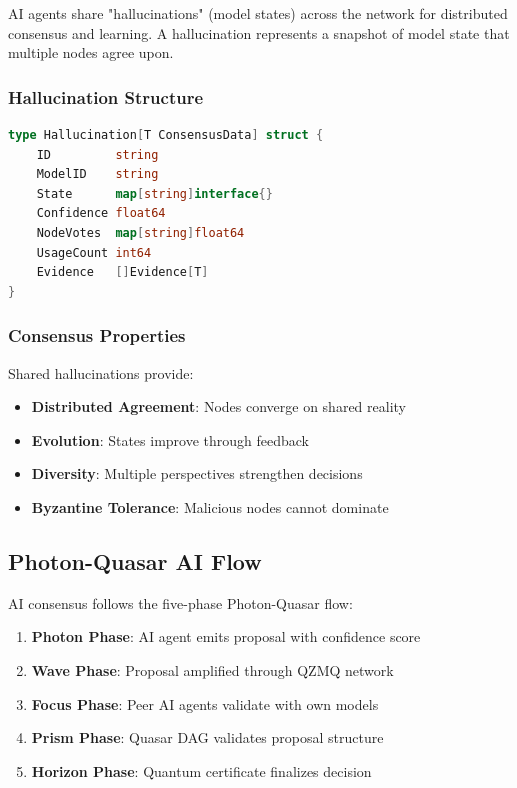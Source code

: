 AI agents share "hallucinations" (model states) across the network for distributed consensus and learning. A hallucination represents a snapshot of model state that multiple nodes agree upon.

\subsubsection{Hallucination Structure}

\begin{lstlisting}[language=Go]
type Hallucination[T ConsensusData] struct {
    ID         string
    ModelID    string
    State      map[string]interface{}
    Confidence float64
    NodeVotes  map[string]float64
    UsageCount int64
    Evidence   []Evidence[T]
}
\end{lstlisting}

\subsubsection{Consensus Properties}

Shared hallucinations provide:

\begin{itemize}
\item \textbf{Distributed Agreement}: Nodes converge on shared reality
\item \textbf{Evolution}: States improve through feedback
\item \textbf{Diversity}: Multiple perspectives strengthen decisions
\item \textbf{Byzantine Tolerance}: Malicious nodes cannot dominate
\end{itemize}

\subsection{Photon-Quasar AI Flow}

AI consensus follows the five-phase Photon-Quasar flow:

\begin{enumerate}
\item \textbf{Photon Phase}: AI agent emits proposal with confidence score
\item \textbf{Wave Phase}: Proposal amplified through QZMQ network
\item \textbf{Focus Phase}: Peer AI agents validate with own models
\item \textbf{Prism Phase}: Quasar DAG validates proposal structure
\item \textbf{Horizon Phase}: Quantum certificate finalizes decision
\end{enumerate}

